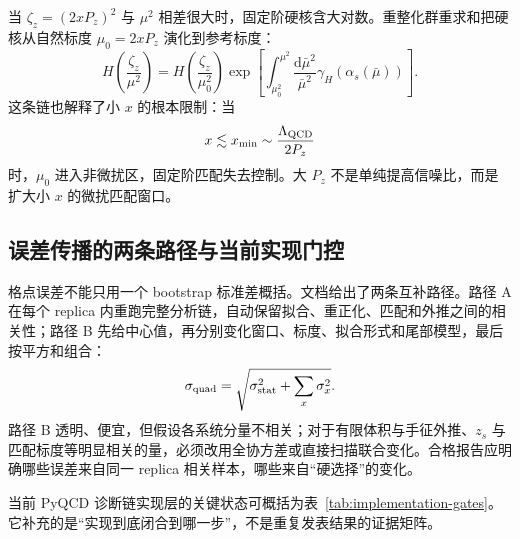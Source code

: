 \documentclass[UTF8,12pt,a4paper,twoside,openany]{ctexbook}
\newcommand{\dd}{\mathrm{d}}
\begin{document}
当 \(\zeta_z=(2xP_z)^2\) 与 \(\mu^2\) 相差很大时，固定阶硬核含大对数。重整化群重求和把硬核从自然标度 \(\mu_0=2xP_z\) 演化到参考标度：
\begin{equation}
  H\!\left(\frac{\zeta_z}{\mu^2}\right)
  =H\!\left(\frac{\zeta_z}{\mu_0^2}\right)
  \exp\left[
  \int_{\mu_0^2}^{\mu^2}\frac{\dd\bar\mu^2}{\bar\mu^2}
  \gamma_H(\alpha_s(\bar\mu))
  \right].
  \label{eq:rgr-hardkernel}
\end{equation}
这条链也解释了小 \(x\) 的根本限制：当
\begin{equation}
  x\lesssim x_{\min}\sim\frac{\Lambda_{\rm QCD}}{2P_z}
  \label{eq:xmin-lamet}
\end{equation}
时，\(\mu_0\) 进入非微扰区，固定阶匹配失去控制。大 \(P_z\) 不是单纯提高信噪比，而是扩大小 \(x\) 的微扰匹配窗口\cite{HeTMD2024,JiReview2021}。

\subsection{误差传播的两条路径与当前实现门控}

格点误差不能只用一个 bootstrap 标准差概括。文档给出了两条互补路径。路径 A 在每个 replica 内重跑完整分析链，自动保留拟合、重正化、匹配和外推之间的相关性；路径 B 先给中心值，再分别变化窗口、标度、拟合形式和尾部模型，最后按平方和组合：
\begin{equation}
  \sigma_{\rm quad}
  =\sqrt{\sigma_{\rm stat}^2+\sum_x\sigma_x^2}.
  \label{eq:quadratureerror}
\end{equation}
路径 B 透明、便宜，但假设各系统分量不相关；对于有限体积与手征外推、\(z_s\) 与匹配标度等明显相关的量，必须改用全协方差或直接扫描联合变化。合格报告应明确哪些误差来自同一 replica 相关样本，哪些来自“硬选择”的变化。

当前 PyQCD 诊断链实现层的关键状态可概括为表~\ref{tab:implementation-gates}。它补充的是“实现到底闭合到哪一步”，不是重复发表结果的证据矩阵。
\end{document}
